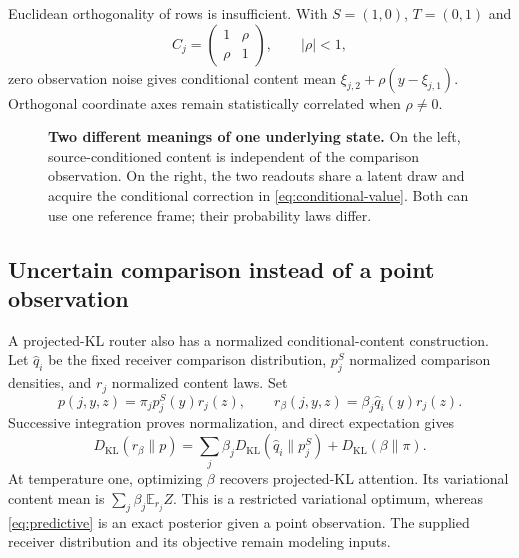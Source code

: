 \documentclass[11pt,letterpaper]{article}
\newcommand{\KL}{D_{\mathrm{KL}}}
\newcommand{\E}{\mathbb E}
\theoremstyle{remark}
\begin{document}
Euclidean orthogonality of rows is insufficient. With $S=(1,0)$, $T=(0,1)$ and
\begin{equation}
 C_j=\begin{pmatrix}1&\rho\\\rho&1\end{pmatrix},\qquad |\rho|<1,
\end{equation}
zero observation noise gives conditional content mean
$\xi_{j,2}+\rho(y-\xi_{j,1})$. Orthogonal coordinate axes remain statistically correlated when $\rho\ne0$.

\begin{figure}[tb]
\centering
{}
\caption{\textbf{Two different meanings of one underlying state.} On the left, source-conditioned content is independent of the comparison observation. On the right, the two readouts share a latent draw and acquire the conditional correction in \eqref{eq:conditional-value}. Both can use one reference frame; their probability laws differ.}
\end{figure}

\subsection{Uncertain comparison instead of a point observation}
A projected-KL router also has a normalized conditional-content construction. Let $\widehat q_i$ be the fixed receiver comparison distribution, $p_j^S$ normalized comparison densities, and $r_j$ normalized content laws. Set
\begin{equation}
 p(j,y,z)=\pi_jp_j^S(y)r_j(z),\qquad
 r_\beta(j,y,z)=\beta_j\widehat q_i(y)r_j(z).
\end{equation}
Successive integration proves normalization, and direct expectation gives
\begin{equation}
 \KL(r_\beta\|p)=
 \sum_j\beta_j\KL(\widehat q_i\|p_j^S)+\KL(\beta\|\pi).
\end{equation}
At temperature one, optimizing $\beta$ recovers projected-KL attention. Its variational content mean is $\sum_j\beta_j\E_{r_j}Z$. This is a restricted variational optimum, whereas \eqref{eq:predictive} is an exact posterior given a point observation. The supplied receiver distribution and its objective remain modeling inputs.
\end{document}
